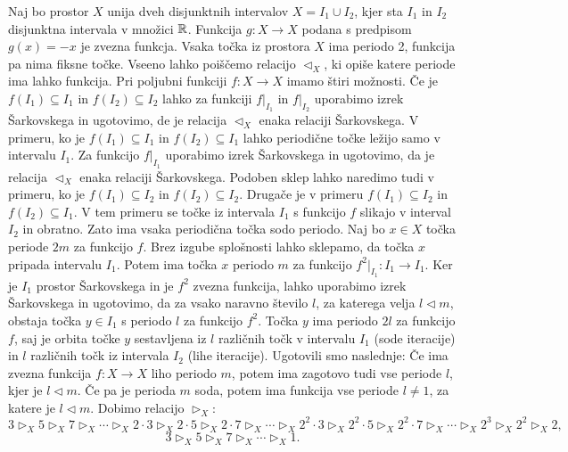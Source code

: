 \documentclass[../TG_magistrsko_delo_sections.tex]{subfiles}
\begin{document}
\begin{primer}
Naj bo prostor $X$ unija dveh disjunktnih intervalov $X=I_1 \cup I_2$, kjer sta $I_1$ in $I_2$ disjunktna intervala v množici $\mathbb R$. Funkcija $g : X \to X$ podana s predpisom $g(x) = -x$ je zvezna funkcja. Vsaka točka iz prostora $X$ ima periodo 2, funkcija pa nima fiksne točke. Vseeno lahko poiščemo relacijo $\triangleleft_X$, ki opiše katere periode ima lahko funkcija.  Pri poljubni funkciji $f: X \to X$ imamo štiri možnosti. Če je $f(I_1) \subseteq I_1$ in $f(I_2) \subseteq I_2$ lahko za funkciji $f|_{I_1}$ in $f|_{I_2}$ uporabimo izrek Šarkovskega in ugotovimo, de je relacija $\triangleleft_X$ enaka relaciji Šarkovskega. V primeru, ko je $f(I_1) \subseteq I_1$ in $f(I_2) \subseteq I_1$ lahko periodične točke ležijo samo v intervalu $I_1$. Za funkcijo $f|_{I_1}$ uporabimo izrek Šarkovskega in ugotovimo, da je relacija $\triangleleft_X$ enaka relaciji Šarkovskega. Podoben sklep lahko naredimo tudi v primeru, ko je $f(I_1) \subseteq I_2$ in $f(I_2) \subseteq I_2$. Drugače je v primeru $f(I_1) \subseteq I_2$ in $f(I_2) \subseteq I_1$. V tem primeru se točke iz intervala $I_1$ s funkcijo $f$ slikajo v interval $I_2$ in obratno. Zato ima vsaka periodična točka sodo periodo. Naj bo $x \in X$ točka periode $2m$ za funkcijo $f$. Brez izgube splošnosti lahko sklepamo, da točka $x$ pripada intervalu $I_1$. Potem ima točka $x$ periodo $m$ za funkcijo $f^2|_{I_1} :I_1 \to I_1$. Ker je $I_1$ prostor Šarkovskega in je $f^2$ zvezna funkcija, lahko uporabimo izrek Šarkovskega in ugotovimo, da za vsako naravno število $l$, za katerega velja $l \triangleleft m$, obstaja točka $y \in I_1$ s periodo $l$ za funkcijo $f^2$. Točka $y$ ima periodo $2l$ za funkcijo $f$, saj je orbita točke $y$ sestavljena iz $l$ različnih točk v intervalu $I_1$ (sode iteracije) in $l$ različnih točk iz intervala $I_2$ (lihe iteracije). 
Ugotovili smo naslednje: Če ima zvezna funkcija $f:X \to X$ liho periodo $m$, potem ima zagotovo tudi vse periode $l$, kjer je $l \triangleleft m$. Če pa je perioda $m$ soda, potem ima funkcija vse periode $l\neq1$, za katere je $l \triangleleft m$. 
Dobimo relacijo $\triangleright_X$:
$$3 \triangleright_X 5 \triangleright_X 7 \triangleright_X \cdots \triangleright_X 2\cdot 3 \triangleright_X 2\cdot 5 \triangleright_X 2\cdot 7 \triangleright_X \cdots \triangleright_X 2^2\cdot 3 \triangleright_X 2^2\cdot 5 \triangleright_X 2^2\cdot 7 \triangleright_X \cdots \triangleright_X 2^3 \triangleright_X 2^2 \triangleright_X 2,$$
$$3 \triangleright_X 5 \triangleright_X 7 \triangleright_X \cdots \triangleright_X 1.$$
\end{primer}
\end{document}
